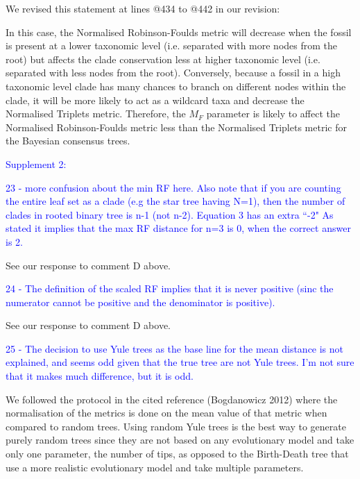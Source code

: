 \documentclass[11pt]{letter}
\begin{document}
\begin{letter}{}
We revised this statement at lines @434 to @442 in our revision:

\hfill\begin{minipage}{\dimexpr\textwidth-1cm}
In this case, the Normalised Robinson-Foulds metric will decrease when the fossil is present at a lower taxonomic level (i.e. separated with more nodes from the root) but affects the clade conservation less at higher taxonomic level (i.e. separated with less nodes from the root). Conversely, because a fossil in a high taxonomic level clade has many chances to branch on different nodes within the clade, it will be more likely to act as a wildcard taxa and decrease the Normalised Triplets metric. Therefore, the $M_{F}$ parameter is likely to affect the Normalised Robinson-Foulds metric less than the Normalised Triplets metric for the Bayesian consensus trees.
\end{minipage}

\textcolor{blue}{Supplement 2:}

\textcolor{blue}{23 - more confusion about the min RF here. Also note that if you are counting the entire leaf set as a clade (e.g the star tree having N=1), then the number of clades in rooted binary tree is n-1 (not n-2). Equation 3 has an extra ``-2" As stated it implies that the max RF distance for n=3 is 0, when the correct answer is 2.}

See our response to comment D above.

\textcolor{blue}{24 - The definition of the scaled RF implies that it is never positive (sinc the numerator cannot be positive and the denominator is positive).}

See our response to comment D above.

\textcolor{blue}{25 - The decision to use Yule trees as the base line for the mean distance is not explained, and seems odd given that the true tree are not Yule trees. I'm not sure that it makes much difference, but it is odd.}

We followed the protocol in the cited reference (Bogdanowicz 2012) where the normalisation of the metrics is done on the mean value of that metric when compared to random trees. Using random Yule trees is the best way to generate purely random trees since they are not based on any evolutionary model and take only one parameter, the number of tips, as opposed to the Birth-Death tree that use a more realistic evolutionary model and take multiple parameters.


\end{letter}
\end{document}

